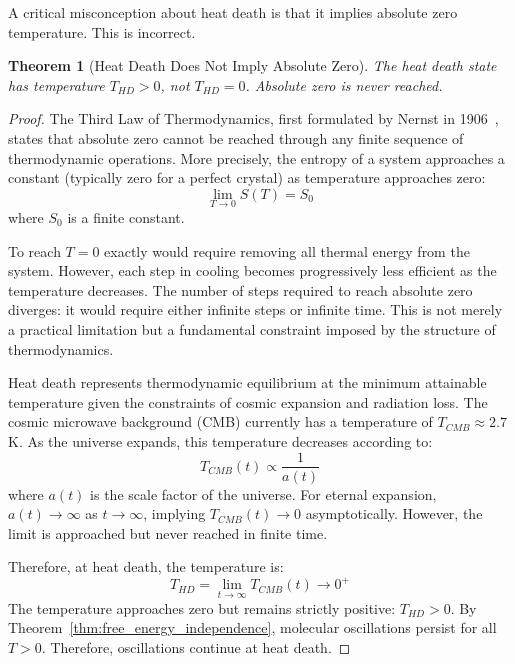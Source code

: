 \documentclass[12pt,a4paper]{article}
\newtheorem{theorem}{Theorem}[section]
\theoremstyle{definition}
\theoremstyle{remark}
\begin{document}
A critical misconception about heat death is that it implies absolute zero temperature. This is incorrect.

\begin{theorem}[Heat Death Does Not Imply Absolute Zero]
\label{thm:not_absolute_zero}
The heat death state has temperature $T_{HD} > 0$, not $T_{HD} = 0$. Absolute zero is never reached.
\end{theorem}

\begin{proof}
The Third Law of Thermodynamics, first formulated by Nernst in 1906~\citep{nernst1906waermetheorem}, states that absolute zero cannot be reached through any finite sequence of thermodynamic operations. More precisely, the entropy of a system approaches a constant (typically zero for a perfect crystal) as temperature approaches zero:
\begin{equation}
\lim_{T \to 0} S(T) = S_0
\end{equation}
where $S_0$ is a finite constant.

To reach $T = 0$ exactly would require removing all thermal energy from the system. However, each step in cooling becomes progressively less efficient as the temperature decreases. The number of steps required to reach absolute zero diverges: it would require either infinite steps or infinite time. This is not merely a practical limitation but a fundamental constraint imposed by the structure of thermodynamics.

Heat death represents thermodynamic equilibrium at the minimum attainable temperature given the constraints of cosmic expansion and radiation loss. The cosmic microwave background (CMB) currently has a temperature of $T_{CMB} \approx 2.7$ K. As the universe expands, this temperature decreases according to:
\begin{equation}
T_{CMB}(t) \propto \frac{1}{a(t)}
\end{equation}
where $a(t)$ is the scale factor of the universe. For eternal expansion, $a(t) \to \infty$ as $t \to \infty$, implying $T_{CMB}(t) \to 0$ asymptotically. However, the limit is approached but never reached in finite time.

Therefore, at heat death, the temperature is:
\begin{equation}
T_{HD} = \lim_{t \to \infty} T_{CMB}(t) \to 0^+
\end{equation}
The temperature approaches zero but remains strictly positive: $T_{HD} > 0$. By Theorem~\ref{thm:free_energy_independence}, molecular oscillations persist for all $T > 0$. Therefore, oscillations continue at heat death.
\end{proof}
\end{document}
